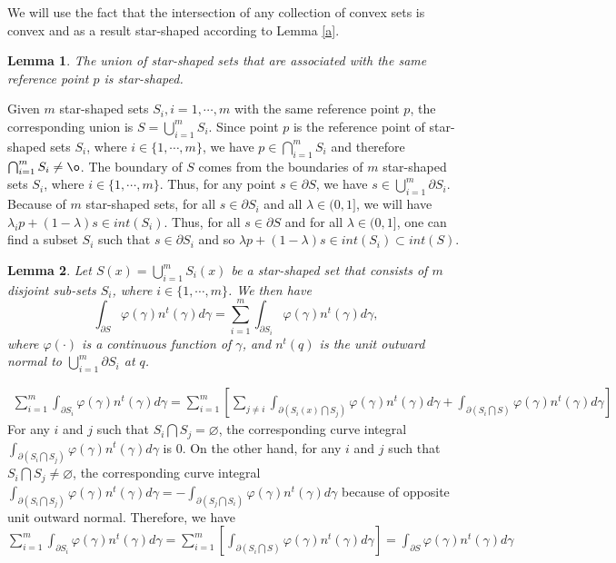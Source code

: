 \documentclass[journal,draftcls,onecolumn,12pt,twoside, narroweqnarray]{IEEEtran}
\newtheorem{Lemma}{Lemma}
\begin{document}
We will use the fact that the intersection of any collection of convex sets is convex \cite{Convexity,ACA} and as a result star-shaped according to Lemma \ref{a}.
\begin{Lemma}
\label{b}
The union of star-shaped sets that are associated with the same reference point $p$ is star-shaped.
\end{Lemma}
\begin{IEEEproof}
Given $m$ star-shaped sets $S_i, i=1,\cdots,m$ with the same reference point $p$, the corresponding union is $S=\bigcup_{i=1}^{m}S_i$. Since point $p$ is the reference point of star-shaped sets $S_i$, where $i\in\{1,\cdots,m\}$, we have $p\in\bigcap_{i=1}^{m}S_i$ and therefore $\bigcap_{i=1}^{m}S_i\ne\o$. The boundary of $S$ comes from the boundaries of $m$ star-shaped sets $S_i$, where $i\in\{1,\cdots,m\}$. Thus, for any point $s\in\partial S$, we have $s\in\bigcup_{i=1}^{m}\partial S_i$. Because of $m$ star-shaped sets, for all $s\in \partial S_i$ and all $\lambda\in(0,1]$, we will have $\lambda_ip+(1-\lambda)s\in int(S_i)$. Thus, for all $s\in \partial S$ and for all $\lambda\in(0,1]$, one can find a subset $S_i$ such that $s\in \partial S_i$ and so $\lambda p+(1-\lambda)s\in int(S_i)\subset int(S)$.
\end{IEEEproof}
\begin{Lemma}
\label{Lamma2}
Let $S(x)=\bigcup_{i=1}^mS_i(x)$ be a star-shaped set that consists of $m$ disjoint sub-sets $S_{i}$, where $i\in\{1,\cdots,m\}$. We then have
\begin{equation}
\int_{\partial S}\varphi(\gamma)n^t(\gamma)d\gamma=\sum_{i=1}^{m}\int_{\partial S_i}\varphi(\gamma)n^t(\gamma)d\gamma,
\end{equation}
where $\varphi(\cdot)$ is a continuous function of $\gamma$, and $n^t(q)$ is the unit outward normal to $\bigcup_{i=1}^m\partial S_i$ at $q$.
\end{Lemma}
\begin{IEEEproof}
\begin{equation}
\begin{aligned}
\sum_{i=1}^{m}\int_{\partial S_i}\varphi(\gamma)n^t(\gamma)d\gamma = \sum_{i=1}^{m}\left[\sum_{j\ne i}{\int_{\partial (S_i(x)\bigcap S_j)}\varphi(\gamma)n^t(\gamma)d\gamma} + \int_{\partial (S_i\bigcap S)}\varphi(\gamma)n^t(\gamma)d\gamma\right]
\end{aligned}
\end{equation}
For any $i$ and $j$ such that $S_i\bigcap S_j=\varnothing$, the corresponding curve integral $\int_{\partial (S_i\bigcap S_j)}\varphi(\gamma)n^t(\gamma)d\gamma$ is 0. On the other hand, for any $i$ and $j$ such that $S_i\bigcap S_j\ne\varnothing$, the corresponding curve integral $\int_{\partial (S_i\bigcap S_j)}\varphi(\gamma)n^t(\gamma)d\gamma=-\int_{\partial (S_j\bigcap S_i)}\varphi(\gamma)n^t(\gamma)d\gamma$ because of opposite unit outward normal. Therefore, we have
$\sum_{i=1}^{m}\int_{\partial S_i}\varphi(\gamma)n^t(\gamma)d\gamma
=\sum_{i=1}^{m}\left[\int_{\partial (S_i\bigcap S)}\varphi(\gamma)n^t(\gamma)d\gamma\right]
=\int_{\partial S}\varphi(\gamma)n^t(\gamma)d\gamma$
\end{IEEEproof}
\end{document}
